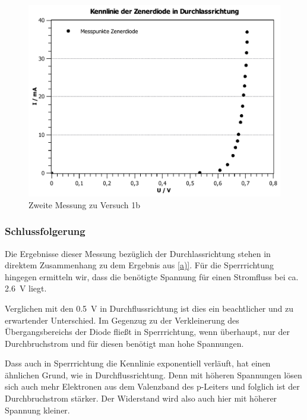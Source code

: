 \documentclass[11pt,a4paper,titlepage, ngerman]{article}
\begin{document}
\begin{itemize}
				 	\begin{figure}
				 		\centering
				 		\includegraphics[width=\textwidth]{KennlinieZenerdiodeDurchlassrichtung.pdf}
				 		\caption{Zweite Messung zu Versuch 1b}
				 		\label{KL b2}
				 	\end{figure}
				 					 	
				\end{itemize}
											
			\subsubsection*{Schlussfolgerung}
				
				Die Ergebnisse dieser Messung bezüglich der Durchlassrichtung stehen in direktem Zusammenhang zu dem Ergebnis aus \ref{a)}. 
				Für die Sperrrichtung hingegen ermitteln wir, dass die benötigte Spannung für einen Stromfluss bei ca. \SI{2.6}{\V} liegt. 
				
				Verglichen mit den \SI{0.5}{\V} in Durchflussrichtung ist dies ein beachtlicher und zu erwartender Unterschied.
				Im Gegenzug zu der Verkleinerung des Übergangsbereichs der Diode fließt in Sperrrichtung, wenn überhaupt, nur der Durchbruchstrom und für diesen benötigt man hohe Spannungen. 
				
				Dass auch in Sperrrichtung die Kennlinie exponentiell verläuft, hat einen ähnlichen Grund, wie in Durchflussrichtung.
				Denn mit höheren Spannungen lösen sich auch mehr Elektronen aus dem Valenzband des p-Leiters und folglich ist der Durchbruchstrom stärker.
				Der Widerstand wird also auch hier mit höherer Spannung kleiner. 
				
\end{document}
